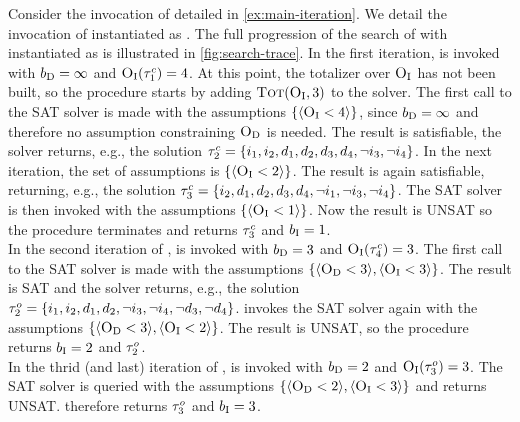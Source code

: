 \begin{example}\label{ex:satunsat}
  Consider the invocation of \algname{} detailed in \cref{ex:main-iteration}. 
  We detail the invocation of \Min{} instantiated as \satunsat{}. 
  The full progression of the search of \algname{} with \Min{} instantiated as \satunsat{} is illustrated in \cref{fig:search-trace}.
  In the first iteration, \satunsat{} is invoked with $b_{\text{D}} =\infty$ and $\textsc{O}_{\text{I}}(\tau^c_1) = 4$.
  At this point, the totalizer over $\textsc{O}_{\text{I}}$ has not been built, so the procedure starts by adding $\textsc{Tot}(\textsc{O}_{\text{I}}, 3)$ to the solver.
  The first call to the SAT solver is made with the assumptions $\{\langle \textsc{O}_{\text{I}} < 4 \rangle\}$, since $b_{\text{D}}  = \infty$ and therefore no assumption constraining $\textsc{O}_{\text{D}}$ is needed.
  The result is satisfiable, the solver returns, e.g., the solution $\tau^c_2 = {\{i_1,\allowbreak i_2,\allowbreak d_1,\allowbreak d_2,\allowbreak d_3,\allowbreak d_4,\allowbreak \lnot i_3,\allowbreak \lnot i_4\}}$. 
  In the next iteration, the set of assumptions is $\{\langle \textsc{O}_{\text{I}} < 2 \rangle\}$.
  The result is again satisfiable, returning, e.g., the solution $\tau^c_3 = {\{i_2,\allowbreak d_1,\allowbreak d_2,\allowbreak d_3,\allowbreak d_4,\allowbreak \lnot i_1,\allowbreak \lnot i_3,\allowbreak \lnot i_4\}}$.
  The SAT solver is then invoked with the assumptions  $\{\langle \textsc{O}_{\text{I}} < 1 \rangle\}$.
  Now the result is UNSAT so the procedure terminates and returns $\tau^c_3$ and $b_{\text{I}} = 1$. \\
  In the second iteration of \algname{}, \satunsat{} is invoked with $b_{\text{D}} = 3$ and $\textsc{O}_{\text{I}}(\tau^c_4) = 3$.
  The first call to the SAT solver is made with the assumptions $\{ \langle \textsc{O}_{\text{D}} < 3 \rangle, \langle \textsc{O}_{\text{I}} < 3 \rangle\}$.
  The result is SAT and the solver returns, e.g., the solution $\tau^o_2 = {\{i_1,\allowbreak i_2,\allowbreak d_1,\allowbreak d_2,\allowbreak \lnot i_3,\allowbreak \lnot i_4,\allowbreak \lnot d_3,\allowbreak \lnot d_4\}}$.
  \satunsat{} invokes the SAT solver again with the assumptions $\{ \langle \textsc{O}_{\text{D}} < 3 \rangle, \langle \textsc{O}_{\text{I}} < 2 \rangle \}$.
  The result is UNSAT, so the procedure returns $b_{\text{I}} = 2$ and $\tau^o_2$. \\
  In the thrid (and last) iteration of \algname{}, \satunsat{} is invoked with $b_{\text{D}} = 2$ and $\textsc{O}_{\text{I}}(\tau^o_3) = 3$.
  The SAT solver is queried with the assumptions $\{ \langle \textsc{O}_{\text{D}} < 2 \rangle, \langle \textsc{O}_{\text{I}} < 3 \rangle \}$ and returns UNSAT.
  \satunsat{} therefore returns $\tau^o_3$ and $b_{\text{I}} = 3$.
\end{example}

\subsection{\unsatsat{}\label{sec:unsat-sat}}


